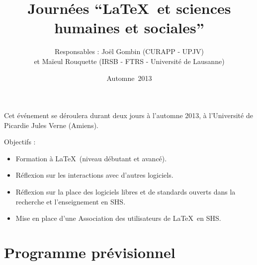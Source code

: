 \documentclass[11pt]{article}
\begin{document}
\title{Journées \enquote{\LaTeX\ et sciences humaines et sociales}}
\author{Responsables : Joël Gombin (CURAPP - UPJV) \\ et Maïeul Rouquette (IRSB - FTRS - Université de Lausanne)}
\date{Automne~2013}
\maketitle


Cet événement se déroulera durant deux jours à l'automne 2013, à l'Université de Picardie Jules Verne (Amiens). 

\vspace{12pt}


Objectifs :
\begin{itemize}
\item Formation à \LaTeX\ (niveau débutant et avancé).
\item Réflexion sur les interactions avec d'autres logiciels.
\item Réflexion sur la place des logiciels libres et de standards ouverts dans la recherche et l'enseignement en SHS.
\item Mise en place d'une Association des utilisateurs de \LaTeX\ en SHS.
\end{itemize}

\section{Programme prévisionnel}
\end{document}
